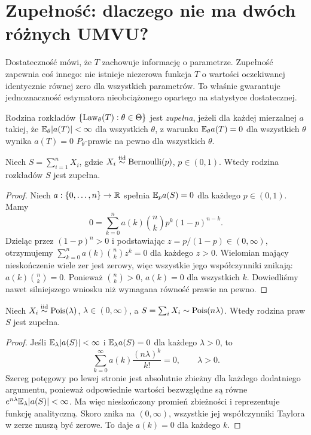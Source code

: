 \section{Zupełność: dlaczego nie ma dwóch różnych UMVU?}
Dostateczność mówi, że $T$ zachowuje informację o parametrze.
Zupełność zapewnia coś innego: nie istnieje niezerowa funkcja
$T$ o wartości oczekiwanej identycznie równej zero dla wszystkich
parametrów. To właśnie gwarantuje jednoznaczność estymatora
nieobciążonego opartego na statystyce dostatecznej.

\begin{definicja}\label{def:completeness}
Rodzina rozkładów $\{\operatorname{Law}_\theta(T):\theta\in\Theta\}$
jest \emph{zupełna}, jeżeli dla każdej mierzalnej $a$ takiej, że
$\mathbb E_\theta|a(T)|<\infty$ dla wszystkich $\theta$, z warunku
$\mathbb E_\theta a(T)=0$ dla wszystkich $\theta$ wynika
$a(T)=0$ $P_\theta$-prawie na pewno dla wszystkich $\theta$.
\end{definicja}

\begin{twierdzenie}
\label{thm:complete-binomial}
Niech $S=\sum_{i=1}^nX_i$, gdzie
$X_i\mathrel{\overset{\mathrm{iid}}\sim}\operatorname{Bernoulli}(p)$, $p\in(0,1)$.
Wtedy rodzina rozkładów $S$ jest zupełna.
\end{twierdzenie}
\begin{proof}
Niech $a:\{0,\ldots,n\}\to\mathbb R$ spełnia
$\mathbb E_p a(S)=0$ dla każdego $p\in(0,1)$. Mamy
\[
0=\sum_{k=0}^n a(k)\binom nk p^k(1-p)^{n-k}.
\]
Dzieląc przez $(1-p)^n>0$ i podstawiając
$z=p/(1-p)\in(0,\infty)$, otrzymujemy
$\sum_{k=0}^n a(k)\binom nk z^k=0$ dla każdego $z>0$.
Wielomian mający nieskończenie wiele zer jest zerowy,
więc wszystkie jego współczynniki znikają:
$a(k)\binom nk=0$. Ponieważ $\binom nk>0$,
$a(k)=0$ dla wszystkich $k$. Dowiedliśmy nawet silniejszego
wniosku niż wymagana równość prawie na pewno.
\end{proof}

\begin{twierdzenie}
\label{thm:complete-poisson}
Niech $X_i\mathrel{\overset{\mathrm{iid}}\sim}\operatorname{Pois}(\lambda)$, $\lambda\in(0,\infty)$,
a $S=\sum_iX_i\sim\operatorname{Pois}(n\lambda)$. Wtedy rodzina praw
$S$ jest zupełna.
\end{twierdzenie}
\begin{proof}
Jeśli $\mathbb E_\lambda|a(S)|<\infty$ i
$\mathbb E_\lambda a(S)=0$ dla każdego $\lambda>0$, to
\[
\sum_{k=0}^\infty a(k)\frac{(n\lambda)^k}{k!}=0,
\qquad\lambda>0.
\]
Szereg potęgowy po lewej stronie jest absolutnie zbieżny
dla każdego dodatniego argumentu, ponieważ odpowiednie
wartości bezwzględne są równe
$e^{n\lambda}\mathbb E_\lambda|a(S)|<\infty$.
Ma więc nieskończony promień zbieżności i reprezentuje
funkcję analityczną. Skoro znika na $(0,\infty)$,
wszystkie jej współczynniki Taylora w zerze muszą być zerowe.
To daje $a(k)=0$ dla każdego $k$.
\end{proof}


